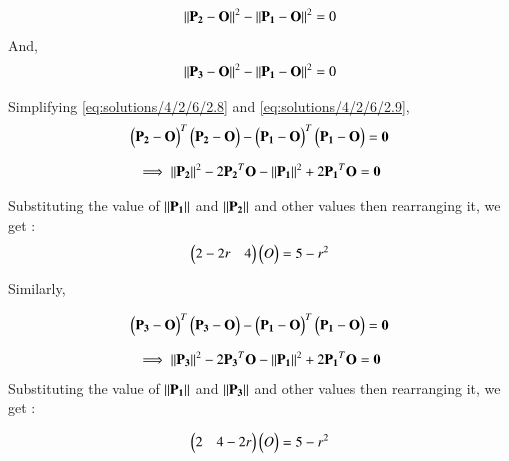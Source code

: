 \begin{align}
\left\lVert  \mathbf{ P_2} - \mathbf{O}\right\rVert^{2}  - \left\lVert \mathbf{P_1}  - \mathbf{O}\right\rVert^{2}   = 0 \label{eq:solutions/4/2/6/2.8}
\end{align}
And,
\begin{align}
\left\lVert \mathbf{ P_3} - \mathbf{O}\right\rVert^{2}   - \left\lVert\mathbf{ P_1} - \mathbf{O}\right\rVert^{2}  = 0 \label{eq:solutions/4/2/6/2.9}
\end{align}

 Simplifying   \ref{eq:solutions/4/2/6/2.8} and \ref{eq:solutions/4/2/6/2.9},
\begin{align}
\begin{pmatrix}\mathbf{P_2} - \mathbf{O}\end{pmatrix}^T \begin{pmatrix}\mathbf{P_2} - \mathbf{ O}\end{pmatrix} - \begin{pmatrix}\mathbf{P_1} - \mathbf{O}\end{pmatrix}^T\begin{pmatrix}\mathbf{P_1} - \mathbf{O}\end{pmatrix} = \mathbf{0} \label{eq:solutions/4/2/6/2.10}
\end{align}



\begin{align}
\implies \left\lVert\mathbf{P_2}\right\rVert^2 - 2 \mathbf{P_2}^T\mathbf{O} - \left\lVert\mathbf{P_1}\right\rVert^2 +2\mathbf{P_1}^T \mathbf{O}  = \mathbf{0} \label{eq:solutions/4/2/6/2.11}
\end{align}

 Substituting the value of $\left\lVert\mathbf{P_1}\right\rVert$ and $\left\lVert\mathbf{P_2}\right\rVert$ and other values then rearranging it, we get :
\begin{align}
\begin{pmatrix}2 -2r & 4 \\\end{pmatrix}\begin{pmatrix}O\end{pmatrix} = 5-r^2 \label{eq:solutions/4/2/6/2.12}
\end{align}





Similarly,

\begin{align}
\begin{pmatrix}\mathbf{P_3} - \mathbf{O}\end{pmatrix}^T \begin{pmatrix}\mathbf{P_3} - \mathbf{ O}\end{pmatrix} - \begin{pmatrix}\mathbf{P_1} - \mathbf{O}\end{pmatrix}^T\begin{pmatrix}\mathbf{P_1} - \mathbf{O}\end{pmatrix} = \mathbf{0} \label{eq:solutions/4/2/6/2.13}
\end{align}



\begin{align}
\implies \left\lVert\mathbf{P_3}\right\rVert^2 - 2 \mathbf{P_3}^T\mathbf{O} - \left\lVert\mathbf{P_1}\right\rVert^2 +2\mathbf{P_1}^T \mathbf{O}  = \mathbf{0} \label{eq:solutions/4/2/6/2.14}
\end{align}
Substituting the value of $\left\lVert\mathbf{P_1}\right\rVert$ and $\left\lVert\mathbf{P_3}\right\rVert$ and other values then  rearranging it, we get :

\begin{align}
\begin{pmatrix}2  & 4 -2r \\\end{pmatrix}\begin{pmatrix}O\end{pmatrix} = 5-r^2 \label{eq:solutions/4/2/6/2.15}
\end{align}















